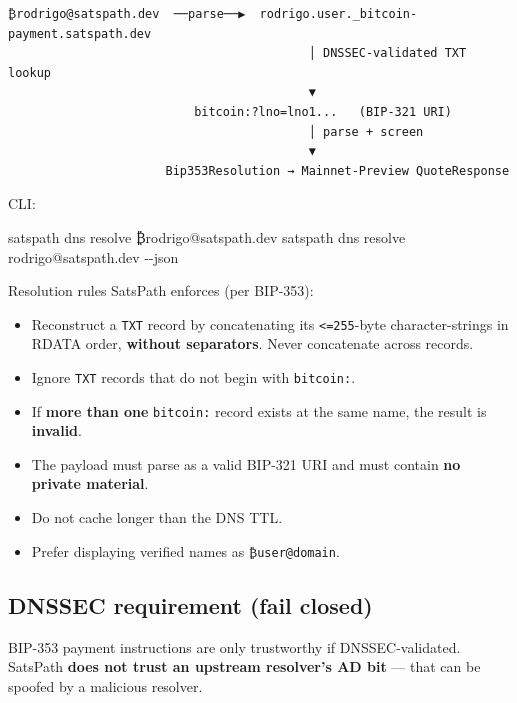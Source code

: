 \documentclass[
]{article}
\newenvironment{Shaded}{}{}
\newcommand{\AttributeTok}[1]{\textcolor[rgb]{0.49,0.56,0.16}{#1}}
\newcommand{\ExtensionTok}[1]{#1}
\newcommand{\NormalTok}[1]{#1}
\providecommand{\tightlist}{%
  \setlength{\itemsep}{0pt}\setlength{\parskip}{0pt}}
\begin{document}
\begin{verbatim}
₿rodrigo@satspath.dev  ──parse──▶  rodrigo.user._bitcoin-payment.satspath.dev
                                          │ DNSSEC-validated TXT lookup
                                          ▼
                          bitcoin:?lno=lno1...   (BIP-321 URI)
                                          │ parse + screen
                                          ▼
                      Bip353Resolution → Mainnet-Preview QuoteResponse
\end{verbatim}

CLI:

\begin{Shaded}
\begin{Highlighting}[]
\ExtensionTok{satspath}\NormalTok{ dns resolve ₿rodrigo@satspath.dev}
\ExtensionTok{satspath}\NormalTok{ dns resolve rodrigo@satspath.dev }\AttributeTok{{-}{-}json}
\end{Highlighting}
\end{Shaded}

Resolution rules SatsPath enforces (per BIP-353):

\begin{itemize}
\tightlist
\item
  Reconstruct a \texttt{TXT} record by concatenating its
  \texttt{\textless{}=255}-byte character-strings in RDATA order,
  \textbf{without separators}. Never concatenate across records.
\item
  Ignore \texttt{TXT} records that do not begin with \texttt{bitcoin:}.
\item
  If \textbf{more than one} \texttt{bitcoin:} record exists at the same
  name, the result is \textbf{invalid}.
\item
  The payload must parse as a valid BIP-321 URI and must contain
  \textbf{no private material}.
\item
  Do not cache longer than the DNS TTL.
\item
  Prefer displaying verified names as \texttt{₿user@domain}.
\end{itemize}

\hypertarget{dnssec-requirement-fail-closed}{%
\subsection{DNSSEC requirement (fail
closed)}\label{dnssec-requirement-fail-closed}}

BIP-353 payment instructions are only trustworthy if DNSSEC-validated.
SatsPath \textbf{does not trust an upstream resolver's AD bit} --- that
can be spoofed by a malicious resolver.
\end{document}
